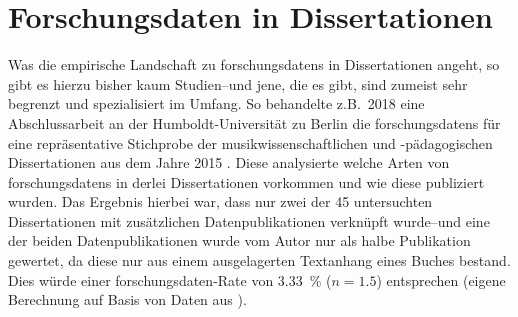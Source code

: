 \section{Forschungsdaten in Dissertationen}\label{sec:forschungsstand-diss}
Was die empirische Landschaft zu \glspl{forschungsdaten} in Dissertationen angeht, so gibt es hierzu bisher kaum Studien--und jene, die es gibt, sind zumeist sehr begrenzt und spezialisiert im Umfang.
So behandelte z.B.~2018 eine Abschlussarbeit an der Humboldt-Universität zu Berlin die \glspl{forschungsdaten} für eine repräsentative Stichprobe der musikwissenschaftlichen und -pädagogischen Dissertationen aus dem Jahre 2015 \autocite{Wünsche2018Forschungsdaten}.
Diese analysierte welche Arten von \glspl{forschungsdaten} in derlei Dissertationen vorkommen und wie diese publiziert wurden.
Das Ergebnis hierbei war, dass nur zwei der \num{45} untersuchten Dissertationen mit zusätzlichen Datenpublikationen verknüpft wurde--und eine der beiden Datenpublikationen wurde vom Autor nur als halbe Publikation gewertet, da diese nur aus einem ausgelagerten Textanhang eines Buches bestand.
Dies würde einer \gls{forschungsdaten}-Rate von \SI{3.33}{\percent} ($n=\num{1.5}$) entsprechen (eigene Berechnung auf Basis von Daten aus \autocite{Wünsche2018Forschungsdaten}).

